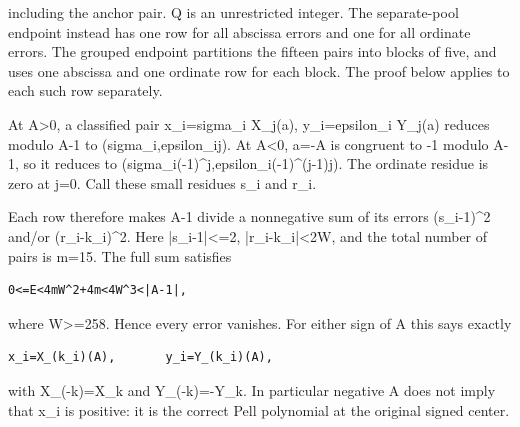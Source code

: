 including the anchor pair. Q is an unrestricted integer. The separate-pool endpoint instead has one row for all abscissa errors and one for all ordinate errors. The grouped endpoint partitions the fifteen pairs into blocks of five, and uses one abscissa and one ordinate row for each block. The proof below applies to each such row separately.



At A\textgreater{}\allowbreak{}0, a classified pair x\_\allowbreak{}i=\allowbreak{}sigma\_\allowbreak{}i X\_\allowbreak{}j(a), y\_\allowbreak{}i=\allowbreak{}epsilon\_\allowbreak{}i Y\_\allowbreak{}j(a) reduces modulo A-1 to (sigma\_\allowbreak{}i,epsilon\_\allowbreak{}i\textasteriskcentered{}\allowbreak{}j). At A\textless{}\allowbreak{}0, a=\allowbreak{}-A is congruent to -1 modulo A-1, so it reduces to (sigma\_\allowbreak{}i\textasteriskcentered{}\allowbreak{}(-1)\textasciicircum{}\allowbreak{}j,epsilon\_\allowbreak{}i\textasteriskcentered{}\allowbreak{}(-1)\textasciicircum{}\allowbreak{}(j-1)\textasteriskcentered{}\allowbreak{}j). The ordinate residue is zero at j=\allowbreak{}0. Call these small residues s\_\allowbreak{}i and r\_\allowbreak{}i.



Each row therefore makes A-1 divide a nonnegative sum of its errors (s\_\allowbreak{}i-1)\textasciicircum{}\allowbreak{}2 and/\allowbreak{}or (r\_\allowbreak{}i-k\_\allowbreak{}i)\textasciicircum{}\allowbreak{}2. Here |s\_\allowbreak{}i-1|\textless{}\allowbreak{}=\allowbreak{}2, |r\_\allowbreak{}i-k\_\allowbreak{}i|\textless{}\allowbreak{}2W, and the total number of pairs is m=\allowbreak{}15. The full sum satisfies



\begin{verbatim}
0<=E<4mW^2+4m<4W^3<|A-1|,
\end{verbatim}

where W\textgreater{}\allowbreak{}=\allowbreak{}258. Hence every error vanishes. For either sign of A this says exactly



\begin{verbatim}
x_i=X_(k_i)(A),       y_i=Y_(k_i)(A),
\end{verbatim}

with X\_\allowbreak{}(-k)=\allowbreak{}X\_\allowbreak{}k and Y\_\allowbreak{}(-k)=\allowbreak{}-Y\_\allowbreak{}k. In particular negative A does not imply that x\_\allowbreak{}i is positive: it is the correct Pell polynomial at the original signed center.



